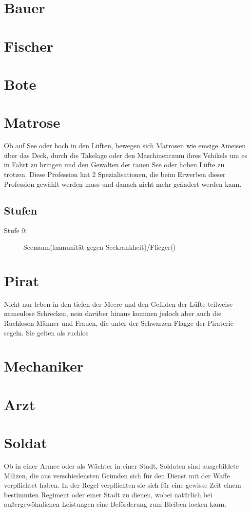 \documentclass[a4paper,12pt,oneside]{book}
\begin{document}
\section{Bauer}
\section{Fischer}
\section{Bote}
\section{Matrose}
Ob auf See oder hoch in den Lüften, bewegen sich Matrosen wie emsige Ameisen über das Deck, durch die Takelage oder den Maschinenraum ihres Vehikels um es in Fahrt zu bringen und den Gewalten der rauen See oder hohen Lüfte zu trotzen. Diese Profession hat 2 Spezialisationen, die beim Erwerben dieser Profession gewählt werden muss und danach nicht mehr geändert werden kann.
\subsection{Stufen}
\begin{description}
\item[Stufe 0:]Seemann(Immunität gegen Seekrankheit)/Flieger()
\end{description}
\section{Pirat}
Nicht nur leben in den tiefen der Meere und den Gefilden der Lüfte teilweise namenlose Schrecken, nein darüber hinaus kommen jedoch aber auch die Ruchlosen Männer und Frauen, die unter der Schwarzen Flagge der Piraterie segeln. Sie gelten als ruchlos
\section{Mechaniker}
\section{Arzt}
\section{Soldat}
Ob in einer Armee oder als Wächter in einer Stadt, Soldaten sind ausgebildete Milizen, die aus verschiedensten Gründen sich für den Dienst mit der Waffe verpflichtet haben. In der Regel verpflichten sie sich für eine gewisse Zeit einem bestimmten Regiment oder einer Stadt zu dienen, wobei natürlich bei außergewöhnlichen Leistungen eine Beförderung zum Bleiben locken kann.
\end{document}
